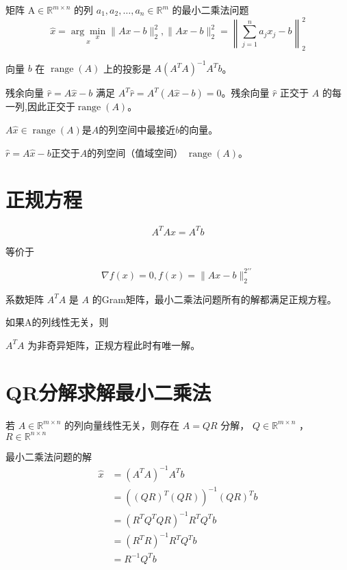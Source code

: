 矩阵 $ \mathrm{A} \in \mathbb{R}^{m \times n} $ 的列 $ a_{1}, a_{2}, \ldots, a_{n} \in \mathbb{R}^{m} $ 的最小二乘法问题
$$
\hat{x}=\underset{x}{\arg \underset{x}{\min}}\|A x-b\|_{2}^{2} ,\|A x-b\|_{2}^{2}=\left\|\sum_{j=1}^{n} a_{j} x_{j}-b\right\|_{2}^{2}
$$

向量 $ b $ 在 $ \operatorname{range}(A) $ 上的投影是 $ A\left(A^{T} A\right)^{-1} A^{T} b $。

残余向量 $ \hat{r}=A \hat{x}-b $ 满足 $ A^{T} \hat{r}=A^{T}(A \hat{x}-b)=0 $。残余向量 $ \hat{r} $ 正交于 $ A $ 的每一列,因此正交于$ \operatorname{range}(A) $。




\begin{theorem}
    $ A \hat{x} \in \operatorname{range}(A) $是$A$的列空间中最接近$b$的向量。 
    
    $ \hat{r}=A \hat{x} -b$正交于$A$的列空间（值域空间） $ \operatorname{range}(A) $。
\end{theorem}

\section{正规方程}

\begin{theorem}[最小二乘法问题的正规方程]
    $$
A^{T} A x=A^{T} b
$$

等价于

$$ \nabla f(x)=0, f(x)=\|A x-b\|_{2}^{2 \prime \prime} $$
\end{theorem}

系数矩阵 $ A^{T} A $ 是 $ A $ 的Gram矩阵，最小二乘法问题所有的解都满足正规方程。

\begin{theorem}
    如果A的列线性无关，则

    $ A^{T} A $ 为非奇异矩阵，正规方程此时有唯一解。
\end{theorem}


\section{QR分解求解最小二乘法}

\begin{theorem}[QR分解求解最小二乘法]
    若 $ {A} \in \mathbb{R}^{m \times n} $ 的列向量线性无关，则存在 $ {A}={QR} $ 分解， $ Q \in \mathbb{R}^{m \times n} $ ， $ R \in \mathbb{R}^{{n} \times n} $ 
    
    最小二乘法问题的解
$$
\begin{aligned}
\hat{x}&=\left(A^{T} A\right)^{-1} A^{T} b \\
&=\left((Q R)^{T}(Q R)\right)^{-1}(Q R)^{T} b \\
&=\left(R^{T} Q^{T} Q R\right)^{-1} R^{T} Q^{T} b \\
&=\left(R^{T} R\right)^{-1} R^{T} Q^{T} b \\
&=R^{-1} Q^{T} b
\end{aligned}
$$
\end{theorem}


